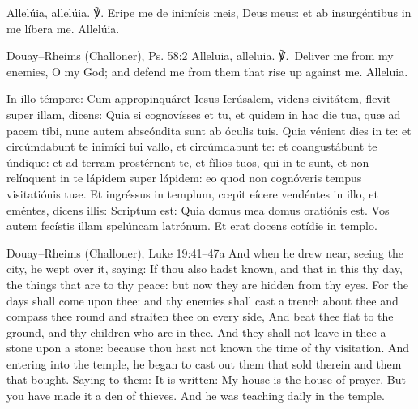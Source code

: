 Allelúia, allelúia. \textnormal{℣.} Eripe me de inimícis meis, Deus meus: et
ab insurgéntibus in me líbera me. Allelúia.
\finishfulltextelement
\begin{fulltextenglish}{Douay--Rheims (Challoner), Ps. 58:2}
Alleluia, alleluia. ℣.~Deliver me from my enemies, O my God; and defend me
from them that rise up against me. Alleluia.
\end{fulltextenglish}

In illo témpore: Cum appropinquáret Iesus Ierúsalem, videns civitátem, flevit
super illam, dicens: Quia si cognovísses et tu, et quidem in hac die tua, quæ
ad pacem tibi, nunc autem abscóndita sunt ab óculis tuis. Quia vénient dies
in te: et circúmdabunt te inimíci tui vallo, et circúmdabunt te: et
coangustábunt te úndique: et ad terram prostérnent te, et fílios tuos, qui in
te sunt, et non relínquent in te lápidem super lápidem: eo quod non
cognóveris tempus visitatiónis tuæ. Et ingréssus in templum, cœpit eícere
vendéntes in illo, et eméntes, dicens illis: Scriptum est: Quia domus mea
domus oratiónis est. Vos autem fecístis illam spelúncam latrónum. Et erat
docens cotídie in templo.
\finishfulltextelement
\begin{fulltextenglish}{Douay--Rheims (Challoner), Luke 19:41--47a}
And when he drew near, seeing the city, he wept over it, saying: If thou also
hadst known, and that in this thy day, the things that are to thy peace: but
now they are hidden from thy eyes. For the days shall come upon thee: and thy
enemies shall cast a trench about thee and compass thee round and straiten
thee on every side, And beat thee flat to the ground, and thy children who
are in thee. And they shall not leave in thee a stone upon a stone: because
thou hast not known the time of thy visitation. And entering into the temple,
he began to cast out them that sold therein and them that bought. Saying to
them: It is written: My house is the house of prayer. But you have made it a
den of thieves. And he was teaching daily in the temple.
\end{fulltextenglish}

